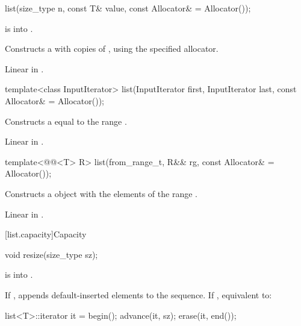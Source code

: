 %
\begin{itemdecl}
list(size_type n, const T& value, const Allocator& = Allocator());
\end{itemdecl}

\begin{itemdescr}
\pnum
\expects
{} is  into .

\pnum
\effects
Constructs a
with
copies of
,
using the specified allocator.

\pnum
\complexity
Linear in
.
\end{itemdescr}

%
\begin{itemdecl}
template<class InputIterator>
  list(InputIterator first, InputIterator last, const Allocator& = Allocator());
\end{itemdecl}

\begin{itemdescr}
\pnum
\effects
Constructs a
equal to the range
.

\pnum
\complexity
Linear in
.
\end{itemdescr}

%
\begin{itemdecl}
template<@@<T> R>
  list(from_range_t, R&& rg, const Allocator& = Allocator());
\end{itemdecl}

\begin{itemdescr}
\pnum
\effects
Constructs a  object with the elements of the range .

\pnum
\complexity
Linear in .
\end{itemdescr}

[list.capacity]{Capacity}

%
\begin{itemdecl}
void resize(size_type sz);
\end{itemdecl}

\begin{itemdescr}
\pnum
\expects
{} is  into .

\pnum
\effects
If ,
appends  default-inserted elements to the
sequence.
If , equivalent to:

\begin{codeblock}
list<T>::iterator it = begin();
advance(it, sz);
erase(it, end());
\end{codeblock}
\end{itemdescr}

